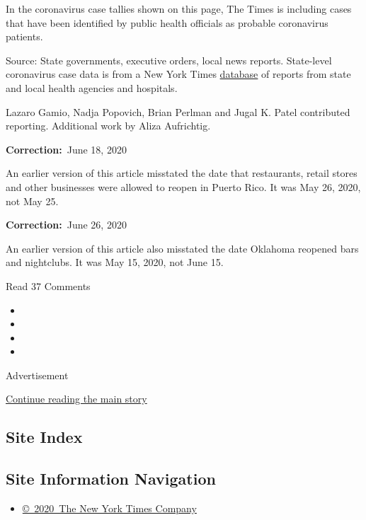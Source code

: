 In the coronavirus case tallies shown on this page, The Times is
including cases that have been identified by public health officials as
probable coronavirus patients.

Source: State governments, executive orders, local news reports.
State-level coronavirus case data is from a New York Times
\href{https://www.nytimes3xbfgragh.onion/interactive/2020/us/coronavirus-us-cases.html}{database}
of reports from state and local health agencies and hospitals.

Lazaro Gamio, Nadja Popovich, Brian Perlman and Jugal K. Patel
contributed reporting. Additional work by Aliza Aufrichtig.

\textbf{Correction:}~June 18, 2020

An earlier version of this article misstated the date that restaurants,
retail stores and other businesses were allowed to reopen in Puerto
Rico. It was May 26, 2020, not May 25.

\textbf{Correction:}~June 26, 2020

An earlier version of this article also misstated the date Oklahoma
reopened bars and nightclubs. It was May 15, 2020, not June 15.

Read 37 Comments

\begin{itemize}
\item
\item
\item
\item
\end{itemize}

Advertisement

\protect\hyperlink{after-bottom}{Continue reading the main story}

\hypertarget{site-index}{%
\subsection{Site Index}\label{site-index}}

\hypertarget{site-information-navigation}{%
\subsection{Site Information
Navigation}\label{site-information-navigation}}

\begin{itemize}
\tightlist
\item
  \href{https://help.nytimes3xbfgragh.onion/hc/en-us/articles/115014792127-Copyright-notice}{©~2020~The
  New York Times Company}
\end{itemize}

